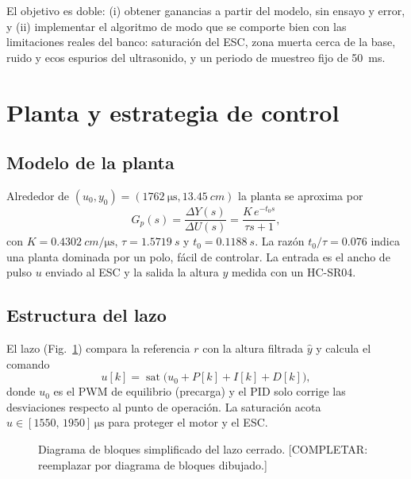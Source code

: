 \documentclass[conference,10pt]{IEEEtran}
\begin{document}
El objetivo es doble: (i) obtener ganancias a partir del modelo, sin ensayo y error, y (ii) implementar el algoritmo de modo que se comporte bien con las limitaciones reales del banco: saturación del ESC, zona muerta cerca de la base, ruido y ecos espurios del ultrasonido, y un periodo de muestreo fijo de \SI{50}{ms}.

\section{Planta y estrategia de control}

\subsection{Modelo de la planta}
Alrededor de $(u_0,y_0)=(\SI{1762}{\micro\second},\SI{13.45}{cm})$ la planta se aproxima por
\begin{equation}
G_p(s)=\frac{\Delta Y(s)}{\Delta U(s)}=\frac{K\,e^{-t_0 s}}{\tau s+1},
\label{eq:planta}
\end{equation}
con $K=\SI{0.4302}{cm/\micro\second}$, $\tau=\SI{1.5719}{s}$ y $t_0=\SI{0.1188}{s}$. La razón $t_0/\tau=0.076$ indica una planta dominada por un polo, fácil de controlar. La entrada es el ancho de pulso $u$ enviado al ESC y la salida la altura $y$ medida con un HC-SR04.

\subsection{Estructura del lazo}
El lazo (Fig.~\ref{fig:lazo}) compara la referencia $r$ con la altura filtrada $\hat y$ y calcula el comando
\begin{equation}
u[k]=\operatorname{sat}\bigl(u_0 + P[k] + I[k] + D[k]\bigr),
\label{eq:u}
\end{equation}
donde $u_0$ es el PWM de equilibrio (precarga) y el PID solo corrige las desviaciones respecto al punto de operación. La saturación acota $u\in[1550,\,1950]\,\si{\micro\second}$ para proteger el motor y el ESC.

\begin{figure}[t]
\centering
{}
\caption{Diagrama de bloques simplificado del lazo cerrado. [COMPLETAR: reemplazar por diagrama de bloques dibujado.]}
\label{fig:lazo}
\end{figure}
\end{document}
